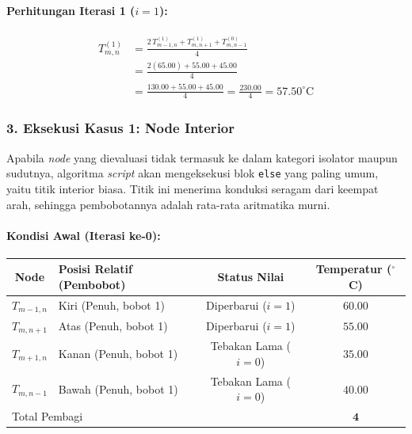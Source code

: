 \documentclass[12pt,a4paper]{article}
\begin{document}
\paragraph{Perhitungan Iterasi 1 ($i = 1$):}
\begin{align*}
T_{m,n}^{(1)}
    &= \frac{2\,T_{m-1,n}^{(1)} + T_{m,n+1}^{(1)} + T_{m,n-1}^{(0)}}{4} \\[4pt]
    &= \frac{2(65.00) + 55.00 + 45.00}{4} \\[4pt]
    &= \frac{130.00 + 55.00 + 45.00}{4} = \frac{230.00}{4} = \boxed{57.50^\circ\text{C}}
\end{align*}

\subsubsection*{3. Eksekusi Kasus 1: Node Interior}
Apabila \textit{node} yang dievaluasi tidak termasuk ke dalam kategori isolator maupun sudutnya, algoritma \textit{script} akan mengeksekusi blok \texttt{else} yang paling umum, yaitu titik interior biasa. Titik ini menerima konduksi seragam dari keempat arah, sehingga pembobotannya adalah rata-rata aritmatika murni.

\paragraph{Kondisi Awal (Iterasi ke-0):}
\begin{center}
\renewcommand{\arraystretch}{1.2}
\begin{tabular}{|c|l|c|c|}
\hline
\textbf{Node} & \textbf{Posisi Relatif (Pembobot)} & \textbf{Status Nilai} & \textbf{Temperatur ($^\circ$C)} \\
\hline
$T_{m-1,n}$ & Kiri (Penuh, bobot 1) & Diperbarui ($i=1$) & $60.00$ \\
$T_{m,n+1}$ & Atas (Penuh, bobot 1) & Diperbarui ($i=1$) & $55.00$ \\
$T_{m+1,n}$ & Kanan (Penuh, bobot 1) & Tebakan Lama ($i=0$) & $35.00$ \\
$T_{m,n-1}$ & Bawah (Penuh, bobot 1) & Tebakan Lama ($i=0$) & $40.00$ \\
\hline
\multicolumn{3}{|l|}{Total Pembagi} & $\mathbf{4}$ \\
\hline
\end{tabular}
\end{center}
\end{document}

